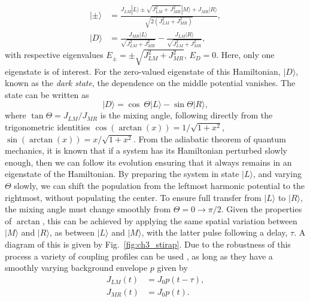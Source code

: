 \begin{subequations}
\begin{align}
    | \pm \rangle &= \frac{J_{LM} |L\rangle \pm \sqrt{J_{LM}^2 + J_{MR}^2}|M\rangle + J_{MR} |R\rangle  }{\sqrt{2(J_{LM}^2 + J_{MR}^2)}}, \\
    | D \rangle &= \frac{J_{MR} |L\rangle }{\sqrt{J_{LM}^2 + J_{MR}^2}} - \frac{J_{LM} |R\rangle}{\sqrt{J_{LM}^2 + J_{MR}^2}},
\end{align}
\end{subequations}
with respective eigenvalues $E_{\pm} = \pm {\sqrt{J_{LM}^2 + J_{MR}^2}}$, $E_D = 0$.
Here, only one eigenstate is of interest. For the zero-valued eigenstate of this Hamiltonian, $|D \rangle$, known as the \textit{dark state}, the dependence on the middle potential vanishes. The state can be written as
\begin{equation}
 | D \rangle = \cos\ \Theta| L \rangle - \sin \Theta | R \rangle,
\end{equation}
where $\tan \Theta=J_{LM}/J_{MR}$ is the mixing angle, following directly from the trigonometric identities $\cos (\arctan (x)) = 1/\sqrt{1+x^2}$, $\sin (\arctan (x)) = x/\sqrt{1+x^2}$. From the adiabatic theorem of quantum mechanics, it is known that if a system has its Hamiltonian perturbed slowly enough, then we can follow its evolution ensuring that it always remains in an eigenstate of the Hamiltonian. By preparing the system in state $| L \rangle$, and varying $\Theta$ slowly, we can shift the population from the leftmost harmonic potential to the rightmost, without populating the center. To ensure full transfer from $|L \rangle$ to $| R \rangle$, the mixing angle must change smoothly from $\Theta = 0 \rightarrow \pi/2$. Given the properties of $\arctan$, this can be achieved by applying the same spatial variation between $|M \rangle$ and $| R\rangle$, as between $|L \rangle$ and $| M\rangle$, with the latter pulse following a delay, $\tau$. A diagram of this is given by Fig.~\ref{fig:ch3_stirap}. Due to the robustness of this process a variety of coupling profiles can be used \cite{AO:Bergmann_jcp_2015}, as long as they have a smoothly varying background envelope $p$ given by \cite{AO:Fewell_ausjp_1997}
\begin{subequations}
\begin{align}
    J_{LM}(t) &= J_0 p(t-\tau), \\
    J_{MR}(t) &= J_0 p(t).
\end{align}
\end{subequations}


